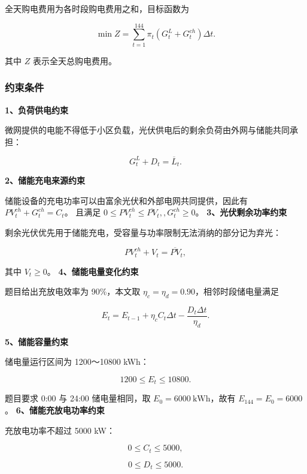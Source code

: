 全天购电费用为各时段购电费用之和，目标函数为

\begin{equation}
\min Z=
\sum_{t=1}^{144}
\pi_t
\left(G_t^L+G_t^{ch}\right)\Delta t.
\end{equation}

其中 \(Z\) 表示全天总购电费用。

\subsubsection{约束条件}

\textbf{1、负荷供电约束}

微网提供的电能不得低于小区负载，光伏供电后的剩余负荷由外网与储能共同承担：

\begin{equation}
G_t^L+D_t=\overline L_t.
\end{equation}

\textbf{2、储能充电来源约束}

储能设备的充电功率可以由富余光伏和外部电网共同提供，因此有 \(PV_t^{ch}+G_t^{ch}=C_t\)。 且满足 \(0\leq PV_t^{ch}\leq\overline{PV}_t,, G_t^{ch}\geq0\)。 \textbf{3、光伏剩余功率约束}

剩余光伏优先用于储能充电，受容量与功率限制无法消纳的部分记为弃光：

\begin{equation}
PV_t^{ch}+V_t=\overline{PV}_t,
\end{equation}

其中 \(V_t\geq0\)。 \textbf{4、储能电量变化约束}

题目给出充放电效率为 90\%，本文取 \(\eta_c=\eta_d=0.90\)，相邻时段储电量满足

\begin{equation}
E_t
=
E_{t-1}
+\eta_cC_t\Delta t
-\frac{D_t\Delta t}{\eta_d}.
\end{equation}

\textbf{5、储能容量约束}

储电量运行区间为 1200～10800 kWh：

\begin{equation}
1200\leq E_t\leq10800.
\end{equation}

题目要求 0:00 与 24:00 储电量相同，取 \(E_0=6000\ \mathrm{kWh}\)，故有 \(E_{144}=E_0=6000\)。 \textbf{6、储能充放电功率约束}

充放电功率不超过 5000 kW：

\[
0\leq C_t\leq5000,
\]

\begin{equation}
0\leq D_t\leq5000.
\end{equation}


